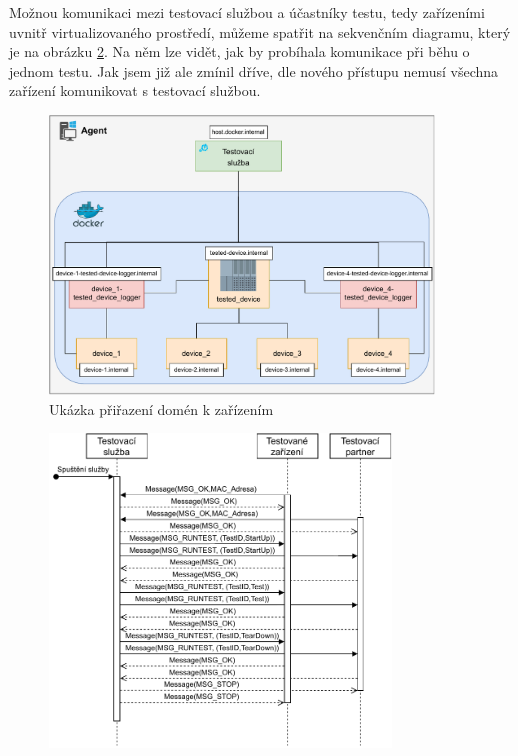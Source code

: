 Možnou komunikaci mezi testovací službou a účastníky testu, tedy zařízeními uvnitř virtualizovaného prostředí, můžeme spatřit na sekvenčním diagramu, který je na obrázku \ref{fig:seqdiag}. Na něm lze vidět, jak by probíhala komunikace při běhu o jednom testu. Jak jsem již ale zmínil dříve, dle nového přístupu nemusí všechna zařízení komunikovat s testovací službou. 

\begin{figure}[H]
    \centering 
    \includegraphics[width=0.91\textwidth]{assets/img/domain_resolving.pdf}
    \caption{Ukázka přiřazení domén k zařízením}
    \label{fig:domain_resolving}
\end{figure}

\begin{figure}[H]
    \centering 
    \includegraphics[width=0.81\textwidth]{assets/img/bp_assets/sequencediagram.pdf}
    \label{fig:seqdiag}
\end{figure}

